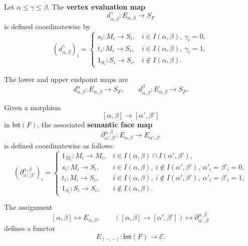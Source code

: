 \begin{definition}
\label{def:cmett-vertex-evaluation-maps}
    Let \(\alpha\leq\gamma\leq\beta\). The \textbf{vertex evaluation map}
    \[
        d_{\alpha,\beta}^{\gamma}:E_{\alpha,\beta}\to S_F
    \]
    is defined coordinatewise by
    \[
        (d_{\alpha,\beta}^{\gamma})_i
        =
        \begin{cases}
        s_i:M_i\to S_i,
            & i\in I(\alpha,\beta),\ \gamma_i=0,\\[2pt]
        t_i:M_i\to S_i,
            & i\in I(\alpha,\beta),\ \gamma_i=1,\\[2pt]
        1_{S_i}:S_i\to S_i,
            & i\notin I(\alpha,\beta).
        \end{cases}
    \]
\end{definition}

The lower and upper endpoint maps are
\[
    d_{\alpha,\beta}^{\alpha}:E_{\alpha,\beta}\to S_F,
    \qquad
    d_{\alpha,\beta}^{\beta}:E_{\alpha,\beta}\to S_F.
\]

\begin{definition}
\label{def:cmett-interval-semantic-face-map}
    Given a morphism
    \[
        [\alpha,\beta]\to[\alpha',\beta']
    \]
    in \(\mathsf{Int}(F)\), the associated \textbf{semantic face map}
    \[
        \partial_{\alpha',\beta'}^{\alpha,\beta}:
        E_{\alpha,\beta}\to E_{\alpha',\beta'}
    \]
    is defined coordinatewise as follows:
    \[
        \left(\partial_{\alpha',\beta'}^{\alpha,\beta}\right)_i
        =
        \begin{cases}
        1_{M_i}:M_i\to M_i,
            & i\in I(\alpha,\beta)\cap I(\alpha',\beta'),\\[2pt]
        s_i:M_i\to S_i,
            & i\in I(\alpha,\beta),\ i\notin I(\alpha',\beta'),\
              \alpha'_i=\beta'_i=0,\\[2pt]
        t_i:M_i\to S_i,
            & i\in I(\alpha,\beta),\ i\notin I(\alpha',\beta'),\
              \alpha'_i=\beta'_i=1,\\[2pt]
        1_{S_i}:S_i\to S_i,
            & i\notin I(\alpha,\beta).
        \end{cases}
    \]
\end{definition}

\begin{proposition}
\label{prop:cmett-interval-execution-functorial}
    The assignment
    \[
        [\alpha,\beta]\longmapsto E_{\alpha,\beta},
        \qquad
        ([\alpha,\beta]\to[\alpha',\beta'])
        \longmapsto
        \partial_{\alpha',\beta'}^{\alpha,\beta}
    \]
    defines a functor
    \[
        E_{(-,-)}:\mathsf{Int}(F)\to\mathcal E.
    \]
\end{proposition}

